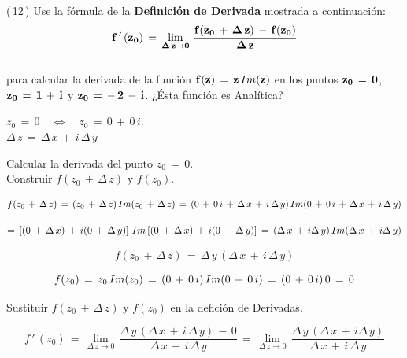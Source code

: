 \documentclass[a4paper,11pt,openany]{book}
\begin{document}
\textcolor{ao(english)}{(\,12\,)} Use la fórmula de la \textbf{Definición de Derivada} mostrada a continuación:\\

$$\bf{f\,'\,(z_{0})\,=\,\displaystyle\lim_{\Delta\,z \to 0}\,\dfrac{f(z_{0}\,+\,\Delta\,z)\,-\,f(z_{0})}{\Delta\,z}}$$\\

para calcular la derivada de la función $\bf{f(z)\,=\,z\,\mathnormal{Im}(z)}$ en los puntos $\bf{z_{0}\,=\,0}$, $\bf{z_{0}\,=\,1\,+\,i}$ y $\bf{z_{0}\,=\,-\,2\,-\,i}$. ¿Ésta función es Analítica?\\

\begin{tcolorbox}[colback=ao(english)!5!white,colframe=ao(english)!75!black,fonttitle=\bfseries,title=\sf Recordemos que:]

\textcolor{ao(english)}{} $z_{0}\,=\,0 \quad\iff\quad z_{0}\,=\,0\,+\,0\,i$.\\

\textcolor{ao(english)}{} $\Delta\,z\,=\,\Delta\,x\,+\,i\,\Delta\,y$

\end{tcolorbox}


\textcolor{ao(english)}{} Calcular la derivada del punto $z_{0}\,=\,0$.\\

\textcolor{ao(english)}{} Construir $f(z_{0}\,+\,\Delta\,z)$ y $f(z_{0})$.

$$f(z_{0}\,+\,\Delta\,z)\,=\,(z_{0}\,+\,\Delta\,z)\,\mathnormal{Im}(z_{0}\,+\,\Delta\,z)\,=\,(0\,+\,0\,i\,+\,\Delta\,x\,+\,i\,\Delta\,y)\,\mathnormal{Im}(0\,+\,0\,i\,+\,\Delta\,x\,+\,i\,\Delta\,y)$$

$$=\,\left[(0\,+\,\Delta\,x)\,+\,i(0\,+\,\Delta\,y)\right]\,\mathnormal{Im}\left[(0\,+\,\Delta\,x)\,+\,i(0\,+\,\Delta\,y)\right]\,=\,(\Delta\,x\,+\,i\Delta\,y)\,\mathnormal{Im}(\Delta\,x\,+\,i\Delta\,y)$$

$$f(z_{0}\,+\,\Delta\,z)\,=\,\Delta\,y\,(\Delta\,x\,+\,i\,\Delta\,y)$$

$$f(z_{0})\,=\,z_{0}\,\mathnormal{Im}(z_{0})\,=\,(0\,+\,0\,i)\,\mathnormal{Im}(0\,+\,0\,i)\,=\,(0\,+\,0\,i)\,0\,=\,0$$

\textcolor{ao(english)}{} Sustituir  $f(z_{0}\,+\,\Delta\,z)$ y $f(z_{0})$ en la defición de Derivadas.

$$f\,'\,(z_{0})\,=\,\displaystyle\lim_{\Delta\,z \to 0}\,\dfrac{\Delta\,y\,(\Delta\,x\,+\,i\,\Delta\,y)\,-\,0}{\Delta\,x\,+\,i\,\Delta\,y}\,=\,\displaystyle\lim_{\Delta\,z \to 0}\,\dfrac{\Delta\,y\,(\Delta\,x\,+\,i\Delta\,y)}{\Delta\,x\,+\,i\,\Delta\,y}$$
\end{document}
